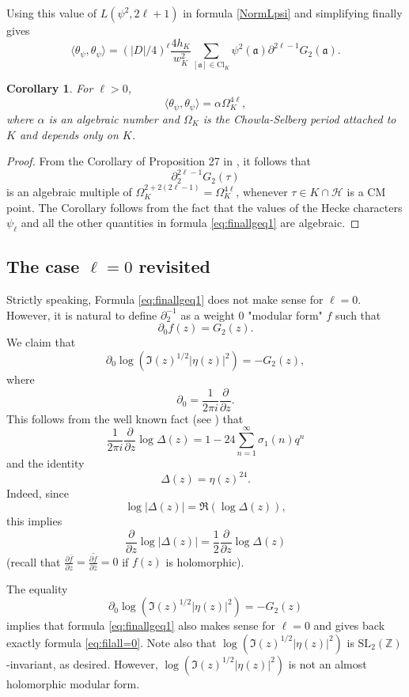 \documentclass[twoside,10pt]{article}
\newtheorem{coro}{Corollary}
\renewcommand{\H}{\mathcal{H}}
\newcommand{\SL}{\textrm{SL}_2(\mathbb{Z})}
\newcommand{\ida}{\mathfrak{a}}
\newcommand{\del}{\partial}
\newcommand{\Clk}{\text{Cl}_K}
\newcommand{\tpsi}{\theta_\psi}
\begin{document}
Using this value of $L(\psi^2,2\ell+1)$ in formula \ref{NormLpsi} and simplifying finally gives
\begin{equation}\label{eq:finallgeq1}\langle\tpsi,\tpsi\rangle =(|D|/4)^\ell\frac{4h_K}{w_K^2}\sum_{[\ida]\in \Clk}\psi^2(\ida)\del^{2\ell-1}G_{2}(\ida).
\end{equation}

\begin{coro}\label{coro:algebraicitytpsi}
	For $\ell>0$,
	\[\langle\tpsi,\tpsi\rangle=\alpha\Omega_K^{4\ell},\]
	where $\alpha$ is an algebraic number and $\Omega_K$ is the Chowla-Selberg period attached to $K$ and depends only on $K$.
\end{coro}
\begin{proof}
	From the Corollary of Proposition 27 in \cite{Zag}, it follows that
	\[\del_2^{2\ell-1}G_2(\tau)\]
	is an algebraic multiple of $\Omega_K^{2+2(2\ell-1)}=\Omega_K^{4\ell}$, whenever $\tau\in K\cap\H$ is a CM point. The Corollary follows from the fact that the values of the Hecke characters $\psi_\ell$ and all the other quantities in formula \ref{eq:finallgeq1} are algebraic.
\end{proof}

\subsection{The case $\ell=0$ revisited}
Strictly speaking, Formula \ref{eq:finallgeq1} does not make sense for $\ell=0$. However, it is natural to define $\del_2^{-1}$ as a weight $0$ "modular form" $f$ such that
\[\del_0 f(z)=G_2(z).\]
We claim that
\[\del_0 \log(\Im(z)^{1/2}|\eta(z)|^2)=-G_2(z),\]
where
\[\del_0=\frac{1}{2\pi i}\frac{\del}{\del z}.\]
This follows from the well known fact (see \cite[Prop. 7]{Zag}) that
\[\frac{1}{2\pi i}\frac{\del}{\del z}\log\Delta(z)=1-24\sum_{n=1}^\infty\sigma_1(n)q^n\]
and the identity
\[\Delta(z)=\eta(z)^{24}.\]
Indeed, since
\[\log|\Delta(z)|=\Re(\log\Delta(z)),\]
this implies
\[\frac{\del}{\del z}\log|\Delta(z)|=\frac{1}{2}\frac{\del}{\del z}\log\Delta(z)\]
(recall that $\frac{\del\bar{f}}{\del z}=\overline{\frac{\del f}{\del \bar{z}}}=0$ if $f(z)$ is holomorphic).

The equality
\[\del_0 \log(\Im(z)^{1/2}|\eta(z)|^2)=-G_2(z)\]
implies that formula \ref{eq:finallgeq1} also makes sense for $\ell=0$ and gives back exactly formula \ref{eq:filall=0}. Note also that $\log(\Im(z)^{1/2}|\eta(z)|^2)$ is $\SL$-invariant, as desired. However, $\log(\Im(z)^{1/2}|\eta(z)|^2)$ is not an almost holomorphic modular form.
\end{document}
